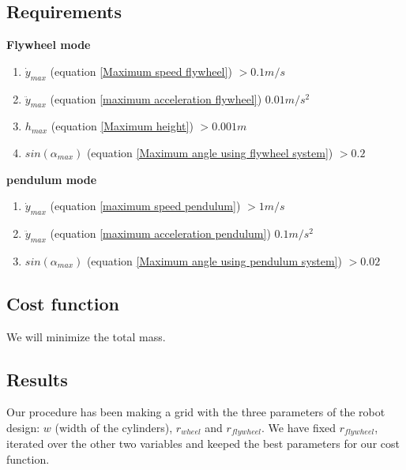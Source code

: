 \subsection{Requirements}
\textbf{Flywheel mode}
\begin{enumerate}
	\item $\dot{y}_{max}$ (equation \ref{Maximum speed flywheel}) $> 0.1m/s$
	\item $\ddot{y}_{max}$ (equation \ref{maximum acceleration flywheel}) $0.01m/s^2$
	\item $h_{max}$ (equation \ref{Maximum height}) $> 0.001m$
	\item $sin(\alpha_{max})$ (equation \ref{Maximum angle using flywheel system}) $> 0.2$
\end{enumerate}
\textbf{pendulum mode}
\begin{enumerate}
	\item $\dot{y}_{max}$ (equation \ref{maximum speed pendulum}) $> 1m/s$
	\item $\ddot{y}_{max}$ (equation \ref{maximum acceleration pendulum}) $0.1m/s^2$
	\item $sin(\alpha_{max})$ (equation \ref{Maximum angle using pendulum system}) $> 0.02$
\end{enumerate}
	


\subsection{Cost function}
We will minimize the total mass.

\subsection{Results}
Our procedure has been making a grid with the three parameters of the robot design: $w$ (width of the cylinders), $r_{wheel}$ and $r_{flywheel}$.
We have fixed $r_{flywheel}$, iterated over the other two variables and keeped the best parameters for our cost function.

